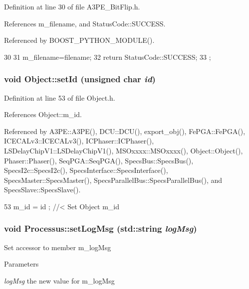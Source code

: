 Definition at line 30 of file A3PE\_\-BitFlip.h.

References m\_\-filename, and StatusCode::SUCCESS.

Referenced by BOOST\_\-PYTHON\_\-MODULE().


\begin{DoxyCode}
30                                          {
31     m_filename=filename;
32     return StatusCode::SUCCESS;
33   };
\end{DoxyCode}
\hypertarget{classObject_a398fe08cba594a0ce6891d59fe4f159f}{
\subsubsection[{setId}]{\setlength{\rightskip}{0pt plus 5cm}void Object::setId (unsigned char {\em id})}}
\label{classObject_a398fe08cba594a0ce6891d59fe4f159f}


Definition at line 53 of file Object.h.

References Object::m\_\-id.

Referenced by A3PE::A3PE(), DCU::DCU(), export\_\-obj(), FePGA::FePGA(), ICECALv3::ICECALv3(), ICPhaser::ICPhaser(), LSDelayChipV1::LSDelayChipV1(), MSOxxxx::MSOxxxx(), Object::Object(), Phaser::Phaser(), SeqPGA::SeqPGA(), SpecsBus::SpecsBus(), SpecsI2c::SpecsI2c(), SpecsInterface::SpecsInterface(), SpecsMaster::SpecsMaster(), SpecsParallelBus::SpecsParallelBus(), and SpecsSlave::SpecsSlave().


\begin{DoxyCode}
53 { m_id    = id    ; } //< Set Object m_id
\end{DoxyCode}
\hypertarget{classProcessus_a471833f89047aa9a7ff6200a31c17a1d}{
\subsubsection[{setLogMsg}]{\setlength{\rightskip}{0pt plus 5cm}void Processus::setLogMsg (std::string {\em logMsg})}}
\label{classProcessus_a471833f89047aa9a7ff6200a31c17a1d}
Set accessor to member m\_\-logMsg 
\begin{DoxyParams}{Parameters}
\item[{\em logMsg}]the new value for m\_\-logMsg \end{DoxyParams}


